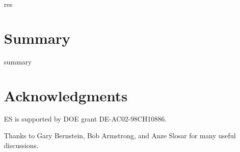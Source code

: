 \documentclass[12pt,preprint]{aastex}
\begin{document}
res

\section{Summary} \label{sec:summary}

summary

\section*{Acknowledgments}

ES is supported by DOE grant DE-AC02-98CH10886.

Thanks to Gary Bernstein, Bob Armstrong, and Anze Slosar for many useful
discussions.



\end{document}
